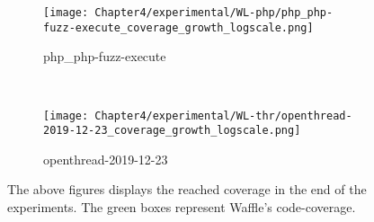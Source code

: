 \begin{figure}[!t]
\begin{subfigure}[t]{0.4\textwidth}
        \centering
        \texttt{[image: Chapter4/experimental/WL-php/php\_php-fuzz-execute\_coverage\_growth\_logscale.png]}
        \vspace*{-5mm}
        \label{wl:php:log}
        \caption{php\_php-fuzz-execute}
    \end{subfigure}
    ~
    \begin{subfigure}[t]{0.4\textwidth}
        \centering
        \texttt{[image: Chapter4/experimental/WL-thr/openthread-2019-12-23\_coverage\_growth\_logscale.png]}
        \label{wl:thr:log}
        \caption{openthread-2019-12-23}
    \end{subfigure}
    \caption{The above figures displays the reached coverage in the end of the experiments. The green boxes represent Waffle's code-coverage.}
    \label{fig:report-log}
\end{figure}



